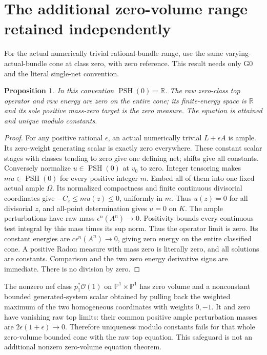 \documentclass[10pt]{article}
\newtheorem{proposition}[theorem]{Proposition}
\newcommand{\PSH}{\operatorname{PSH}}
\begin{document}
\section{The additional zero-volume range retained independently}
For the actual numerically trivial rational-bundle range, use the
same varying-actual-bundle cone at class zero, with zero reference.
This result needs only G0 and the literal single-net convention.

\begin{proposition}
In this convention $\PSH(0)=\mathbb R$. The raw zero-class top
operator and raw energy are zero on the entire cone; its finite-energy
space is $\mathbb R$ and its sole positive mass-zero target is the
zero measure. The equation is attained and unique modulo constants.
\end{proposition}
\begin{proof}
For any positive rational $\epsilon$, an actual numerically trivial
$L+\epsilon A$ is ample. Its zero-weight generating scalar is exactly
zero everywhere. These constant scalar stages with classes tending
to zero give one defining net; shifts give all constants.
Conversely normalize $u\in\PSH(0)$ at $v_0$ to zero. Integer
tensoring makes $mu\in\PSH(0)$ for every positive integer $m$.
Embed all of them into one fixed actual ample $\Omega$. Its normalized
compactness and finite continuous divisorial coordinates give
$-C_z\leq mu(z)\leq0$, uniformly in $m$. Thus $u(z)=0$ for
all divisorial $z$, and all-point determination gives $u=0$ on $K$.
The ample perturbations have raw mass $\epsilon^n(A^n)\to0$.
Positivity bounds every continuous test integral by this mass times
its sup norm. Thus the operator limit is zero. Its constant energies
are $c\epsilon^n(A^n)\to0$, giving zero energy on the entire
classified cone. A positive Radon measure with mass zero is literally
zero, and all solutions are constants. Comparison and the two zero
energy derivative signs are immediate. There is no division by zero.
\end{proof}

The nonzero nef class $p_1^*\mathcal O(1)$ on
$\mathbb P^1\times\mathbb P^1$ has zero volume and a nonconstant
bounded generated-system scalar obtained by pulling back the weighted
maximum of the two homogeneous coordinates with weights $0,-1$.
It and zero have vanishing raw top limits: their common positive ample
perturbation masses are $2\epsilon(1+\epsilon)\to0$. Therefore
uniqueness modulo constants fails for that whole zero-volume bounded
cone with the raw top equation. This safeguard is not an additional
nonzero zero-volume equation theorem.
\end{document}

